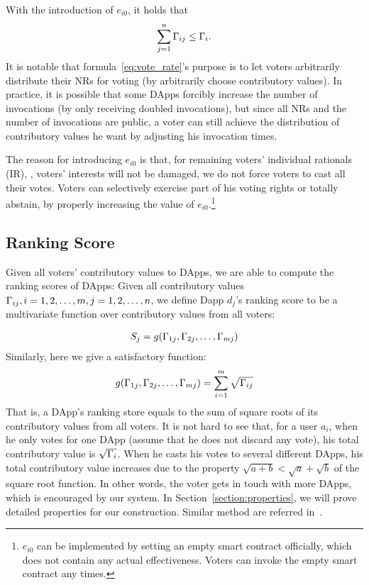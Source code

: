 With the introduction of $e_{i0}$, it holds that
$$\sum_{j=1}^n \Gamma_{ij} \leq \Gamma_i.$$
It is notable that formula~\ref{eq:vote_rate}'s purpose is to let voters
arbitrarily distribute their NRs for voting (by arbitrarily choose contributory
values). In practice, it is possible that some DApps forcibly increase the
number of invocations (by only receiving doubled invocations), but since all
NRs and the number of invocations are public, a voter can still achieve the
distribution of contributory values he want by adjusting his invocation times.

The reason for introducing $e_{i0}$ is that, for remaining voters' individual
rationals (IR), \ie, voters' interests will not be damaged, we do not force voters to cast all their votes. Voters can selectively exercise part of his voting rights or totally abstain, by properly increasing the value of $e_{i0}$.\footnote{$e_{i0}$ can be implemented by setting an empty smart contract officially, which does not contain any actual effectiveness. Voters can invoke the empty smart contract any times.}
\subsection{Ranking Score}
\noindent Given all voters' contributory values to DApps, we are able to compute the
ranking scores of DApps: Given all contributory values
$\Gamma_{ij},i=1,2,\ldots,m,j=1,2,\ldots,n$, we define Dapp $d_j$'s ranking score to be a multivariate function over contributory values from all voters:

\begin{align}
	S_j = g(\Gamma_{1j},\Gamma_{2j},\ldots,\Gamma_{mj})
\end{align}
Similarly, here we give a satisfactory function:
\begin{align}
	\label{eq:sqrt}
	g(\Gamma_{1j},\Gamma_{2j},\ldots,\Gamma_{mj}) = \sum_{i=1}^m \sqrt{\Gamma_{ij}}
\end{align}
That is, a DApp's ranking store equals to the sum of square roots of its
contributory values from all voters. It is not hard to see that, for a user
$a_i$, when he only votes for one DApp (assume that he does not discard any
vote), his total contributory value is $\sqrt{\Gamma_i}$. When he casts his votes
to several different DApps, his total contributory value increases due to the
property $\sqrt{a+b}<\sqrt{a}+\sqrt{b}$ of the square root function. In other
words, the voter gets in touch with more DApps, which is encouraged by our
system. In Section~\ref{section:properties}, we will prove  detailed properties for our construction. Similar method are referred in~\cite{buterin2018liberal}.

